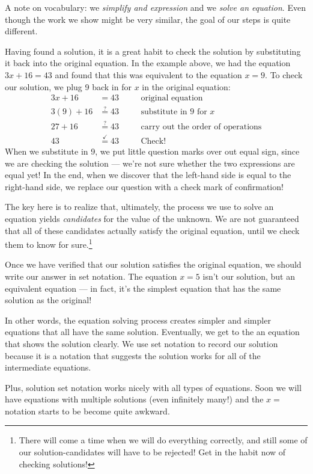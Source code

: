 A note on vocabulary: we \textit{simplify and expression} and we \textit{solve an equation}. Even though the work we show might be very similar, the goal of our steps is quite different.

Having found a solution, it is a great habit to check the solution by substituting it back into the original equation. In the example above, we had the equation $3x+16=43$ and found that this was equivalent to the equation $x=9$. To check our solution, we plug 9 back in for $x$ in the original equation:
\[\begin{aligned}
3x + 16 & = 43
&&\quad\text{original equation}\\
3(9) + 16 & \overset{?}{=} 43
&&\quad\text{substitute in 9 for $x$}\\
27 + 16 & \overset{?}{=} 43
&&\quad\text{carry out the order of operations}\\
43 & \overset{\checkmark}{=} 43
&&\quad\text{Check!}
\end{aligned}\]
When we substitute in 9, we put little question marks over out equal sign, since we are checking the solution --- we're not sure whether the two expressions are equal yet! In the end, when we discover that the left-hand side is equal to the right-hand side, we replace our question with a check mark of confirmation!

The key here is to realize that, ultimately, the process we use to solve an equation yields \textit{candidates} for the value of the unknown. We are not guaranteed that all of these candidates actually satisfy the original equation, until we check them to know for sure.\footnote{There will come a time when we will do everything correctly, and still some of our solution-candidates will have to be rejected! Get in the habit now of checking solutions!}

Once we have verified that our solution satisfies the original equation, we should write our answer in set notation. The equation $x=5$ isn't our solution, but an equivalent equation --- in fact, it's the simplest equation that has the same solution as the original!

In other words, the equation solving process creates simpler and simpler equations that all have the same solution. Eventually, we get to the an equation that shows the solution clearly. We use set notation to record our solution because it is a notation that suggests the solution works for all of the intermediate equations.

Plus, solution set notation works nicely with all types of equations. Soon we will have equations with multiple solutions (even infinitely many!) and the $x=$ notation starts to be become quite awkward.

